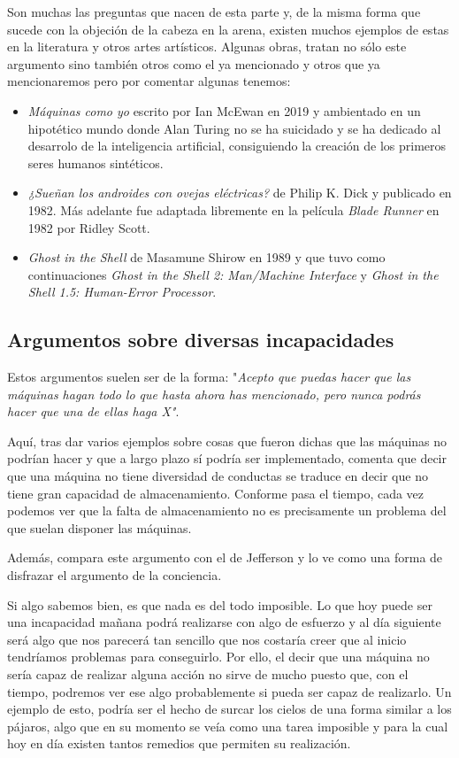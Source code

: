 \documentclass[12pt,a4paper]{article}
\begin{document}
Son muchas las preguntas que nacen de esta parte y, de la misma forma que sucede con la objeción de la cabeza en la arena, existen muchos ejemplos de estas en la literatura y otros artes artísticos. Algunas obras, tratan no sólo este argumento sino también otros como el ya mencionado y otros que ya mencionaremos pero por comentar algunas tenemos:

\begin{itemize}
\item \emph{Máquinas como yo} escrito por Ian McEwan en 2019 y ambientado en un hipotético mundo donde Alan Turing no se ha suicidado y se ha dedicado al desarrolo de la inteligencia artificial, consiguiendo la creación de los primeros seres humanos sintéticos.
\item \emph{¿Sueñan los androides con ovejas eléctricas?} de Philip K. Dick y publicado en 1982. Más adelante fue adaptada libremente en la película \emph{Blade Runner} en 1982 por Ridley Scott.
\item \emph{Ghost in the Shell} de Masamune Shirow en 1989 y que tuvo como continuaciones \emph{Ghost in the Shell 2: Man/Machine Interface} y \emph{Ghost in the Shell 1.5: Human-Error Processor}.
\end{itemize}

\subsection{Argumentos sobre diversas incapacidades}
Estos argumentos suelen ser de la forma: "\emph{Acepto que puedas hacer que las máquinas hagan todo lo que hasta ahora has mencionado, pero nunca podrás hacer que una de ellas haga X"}.

Aquí, tras dar varios ejemplos sobre cosas que fueron dichas que las máquinas no podrían hacer y que a largo plazo sí podría ser implementado, comenta que decir que una máquina no tiene diversidad de conductas se traduce en decir que no tiene gran capacidad de almacenamiento. Conforme pasa el tiempo, cada vez podemos ver que la falta de almacenamiento no es precisamente un problema del que suelan disponer las máquinas.

Además, compara este argumento con el de Jefferson y lo ve como una forma de disfrazar el argumento de la conciencia.

Si algo sabemos bien, es que nada es del todo imposible. Lo que hoy puede ser una incapacidad mañana podrá realizarse con algo de esfuerzo y al día siguiente será algo que nos parecerá tan sencillo que nos costaría creer que al inicio tendríamos problemas para conseguirlo. Por ello, el decir que una máquina no sería capaz de realizar alguna acción no sirve de mucho puesto que, con el tiempo, podremos ver ese algo probablemente si pueda ser capaz de realizarlo. Un ejemplo de esto, podría ser el hecho de surcar los cielos de una forma similar a los pájaros, algo que en su momento se veía como una tarea imposible y para la cual hoy en día existen tantos remedios que permiten su realización.
\end{document}
